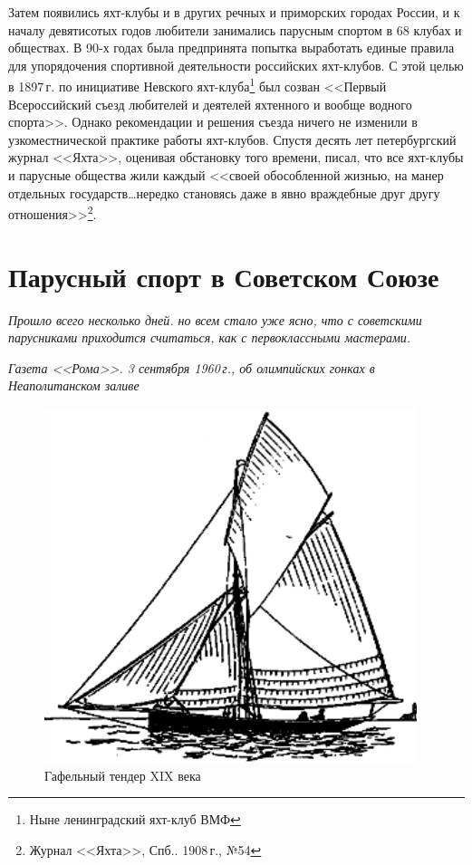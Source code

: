 \documentclass[a4paper, 12pt, twoside, final]{scrbook}
\begin{document}
Затем появились яхт-клубы и в других речных и приморских городах России,
и к началу девятисотых годов любители занимались парусным спортом
в 68 клубах и обществах. В 90-х годах была предпринята попытка выработать
единые правила для упорядочения спортивной деятельности российских
яхт-клубов. С этой целью в 1897\,г. по инициативе Невского яхт-клуба\footnote{Ныне ленинградский яхт-клуб ВМФ}
был созван <<Первый Всероссийский съезд любителей и деятелей яхтенного
и вообще водного спорта>>. Однако рекомендации и решения съезда ничего
не изменили в узкоместнической практике работы яхт-клубов. Спустя
десять лет петербургский журнал <<Яхта>>, оценивая обстановку того времени,
писал, что все яхт-клубы и парусные общества жили каждый <<своей обособленной
жизнью, на манер отдельных государств\ldots нередко становясь даже в
явно враждебные друг другу отношения>>\footnote{Журнал <<Яхта>>, Спб.. 1908\,г., №54}.

\section{Парусный спорт в Советском Союзе}

\epigraph{\emph{Прошло всего несколько дней. но всем стало уже ясно, что с советскими парусниками приходится считаться, как с первоклассными мастерами.}}{\emph{Газета <<Рома>>. 3 сентября 1960\,г., об олимпийских гонках в Неаполитанском заливе}}

\begin{figure}%
\centering\includegraphics{Gafelnyj_tender_konca_XIX_veka}
\caption{Гафельный тендер XIX века}
\end{figure}
\end{document}
